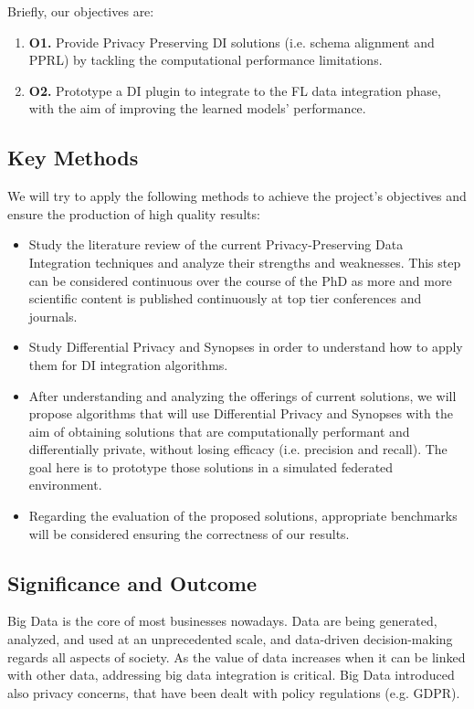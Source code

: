 \documentclass[12pt]{article}
\begin{document}
Briefly, our objectives are:
\begin{enumerate}
   \item \textbf{O1.} Provide Privacy Preserving DI solutions (i.e. schema alignment and PPRL) by tackling the computational performance limitations.
   \item \textbf{O2.} Prototype a DI plugin to integrate to the FL data integration phase, with the aim of improving the 
   learned models' performance.
\end{enumerate}

\subsection{Key Methods}
We will try to apply the following methods to achieve the
project's objectives and ensure the production of high quality results:
\begin{itemize}
   \item Study the literature review of the current Privacy-Preserving Data Integration techniques and analyze their strengths 
   and weaknesses. This step can be considered continuous over the course of the PhD as more and more scientific content is 
   published continuously at top tier conferences and journals.%
   \item Study Differential Privacy and Synopses in order to understand how to apply them for DI integration algorithms.
   \item After understanding and analyzing the offerings of current solutions, we will propose algorithms that will 
   use Differential Privacy and Synopses with the aim of obtaining solutions that are computationally performant and differentially 
   private, without losing efficacy (i.e. precision and recall). 
   The goal here is to prototype those solutions in a simulated federated environment.
   \item Regarding the evaluation of the proposed solutions, appropriate benchmarks will be considered
   ensuring the correctness of our results.
\end{itemize}

\subsection{Significance and Outcome}
Big Data is the core of most businesses nowadays. Data are being generated, analyzed, and used at an unprecedented scale, 
and data-driven decision-making regards all aspects of society. As the value of data increases when it can be linked with other 
data, addressing big data integration is critical. Big Data introduced also privacy concerns, that have been dealt with policy 
regulations (e.g. GDPR).
\end{document}

